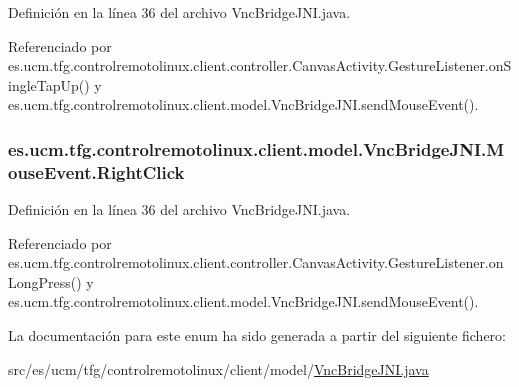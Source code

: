 Definición en la línea 36 del archivo Vnc\-Bridge\-J\-N\-I.\-java.



Referenciado por es.\-ucm.\-tfg.\-controlremotolinux.\-client.\-controller.\-Canvas\-Activity.\-Gesture\-Listener.\-on\-Single\-Tap\-Up() y es.\-ucm.\-tfg.\-controlremotolinux.\-client.\-model.\-Vnc\-Bridge\-J\-N\-I.\-send\-Mouse\-Event().

\hypertarget{enumes_1_1ucm_1_1tfg_1_1controlremotolinux_1_1client_1_1model_1_1VncBridgeJNI_1_1MouseEvent_a2436e1521d0a97377bc32586e630cdd8}{
\subsubsection[{Right\-Click}]{\setlength{\rightskip}{0pt plus 5cm}es.\-ucm.\-tfg.\-controlremotolinux.\-client.\-model.\-Vnc\-Bridge\-J\-N\-I.\-Mouse\-Event.\-Right\-Click}}\label{enumes_1_1ucm_1_1tfg_1_1controlremotolinux_1_1client_1_1model_1_1VncBridgeJNI_1_1MouseEvent_a2436e1521d0a97377bc32586e630cdd8}


Definición en la línea 36 del archivo Vnc\-Bridge\-J\-N\-I.\-java.



Referenciado por es.\-ucm.\-tfg.\-controlremotolinux.\-client.\-controller.\-Canvas\-Activity.\-Gesture\-Listener.\-on\-Long\-Press() y es.\-ucm.\-tfg.\-controlremotolinux.\-client.\-model.\-Vnc\-Bridge\-J\-N\-I.\-send\-Mouse\-Event().



La documentación para este enum ha sido generada a partir del siguiente fichero\-:\begin{DoxyCompactItemize}
\item 
src/es/ucm/tfg/controlremotolinux/client/model/\hyperlink{VncBridgeJNI_8java}{Vnc\-Bridge\-J\-N\-I.\-java}\end{DoxyCompactItemize}
